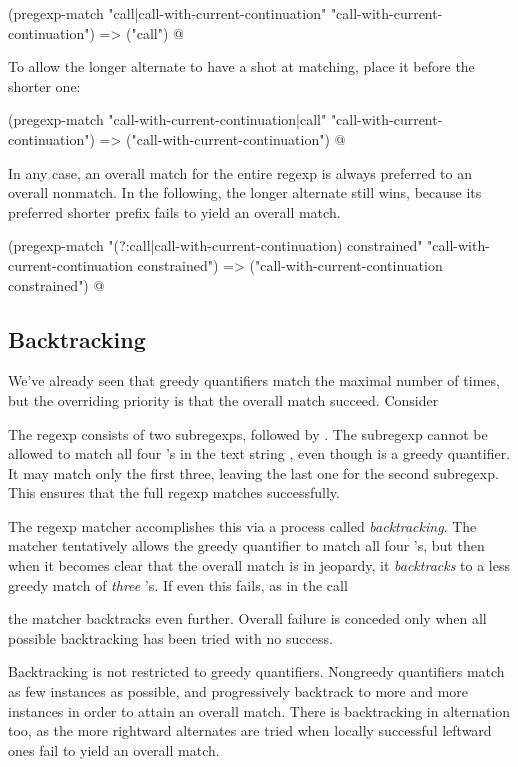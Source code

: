 {\q@
(pregexp-match "call|call-with-current-continuation" 
  "call-with-current-continuation")
=> ("call")
@

To allow the longer alternate to have a shot at 
matching, place it before the shorter one:

\q@
(pregexp-match "call-with-current-continuation|call"
  "call-with-current-continuation")
=> ("call-with-current-continuation")
@

In any case, an overall match for the entire regexp is
always preferred to an overall nonmatch.  In the
following, the longer alternate still wins, because its
preferred shorter prefix fails to yield an overall
match.

\q@
(pregexp-match "(?:call|call-with-current-continuation) constrained"
  "call-with-current-continuation constrained")
=> ("call-with-current-continuation constrained")
@ 



\subsection{Backtracking}

We've already seen that greedy quantifiers match
the maximal number of times, but the overriding priority
is that the overall match succeed.  Consider


\n The regexp consists of two subregexps,
 followed by .
The subregexp  cannot be allowed to match
all four 's in the text string , even though
\p{*} is a greedy quantifier.  It may match only the first
three, leaving the last one for the second subregexp.
This ensures that the full regexp matches successfully.

The regexp matcher accomplishes this via a process
called {\em backtracking}.  The matcher
tentatively allows the greedy quantifier 
to match all four 's, but then when it becomes
clear that the overall match is in jeopardy, it 
{\em backtracks} to a less greedy match of {\em
three} 's.  If even this fails, as in the
call


\n the matcher backtracks even further.  Overall
failure is conceded only when all possible backtracking
has been tried with no success. 

Backtracking is not restricted to greedy quantifiers.
Nongreedy quantifiers match as few instances as
possible, and progressively backtrack to more and more
instances in order to attain an overall match.  There
is backtracking in alternation too, as the more
rightward alternates are tried when locally successful
leftward ones fail to yield an overall match.

}
